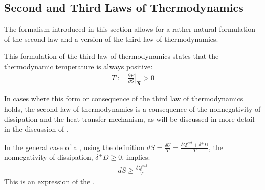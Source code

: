 \documentclass[letterpaper,10pt,english]{jupyterBook}
\begin{document}
\subsection{Second and Third Laws of Thermodynamics}
\label{\detokenize{ch/principles-gibbs-phase-rule:second-and-third-laws-of-thermodynamics}}\label{\detokenize{ch/principles-gibbs-phase-rule:physics-hs-thermodynamics-foundation-principles-gibbs-phase-rule-second}}
\sphinxAtStartPar
The formalism introduced in this section allows for a rather natural formulation of the second law and a version of the third law of thermodynamics.

\sphinxAtStartPar
This formulation of the third law of thermodynamics states that the thermodynamic temperature is always positive:
\begin{equation*}
\begin{split}
T := \left.\frac{\partial E}{\partial S}\right|_{\mathbf{X}} > 0
\end{split}
\end{equation*}
\sphinxAtStartPar
{} 

\sphinxAtStartPar
In cases where this form or consequence of the third law of thermodynamics holds, the second law of thermodynamics is a consequence of the non\sphinxhyphen{}negativity of dissipation and the heat transfer mechanism, as will be discussed in more detail in the discussion of {\hyperref[\detokenize{ch/principles-second:physics-hs-thermodynamics-principles-second-composite}]{}}.

\sphinxAtStartPar
In the general case of a , using the definition \( dS = \frac{\delta U}{T} = \frac{\delta Q^{ext} + \delta^+ D}{T} \), the non\sphinxhyphen{}negativity of dissipation, \( \delta^+ D \ge 0 \), implies:
\begin{equation*}
\begin{split}
dS \ge \frac{\delta Q^{ext}}{T}
\end{split}
\end{equation*}
\sphinxAtStartPar
This is an expression of the {\hyperref[\detokenize{ch/principles-second:physics-hs-thermodynamics-foundation-principles-second}]{}}.

\sphinxAtStartPar
{}    
\end{document}

